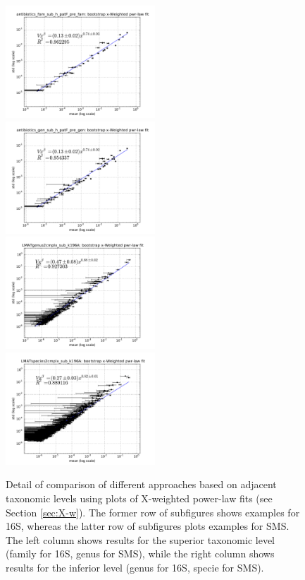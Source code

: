\begin{figure} 
  \includegraphics[width=0.5\textwidth]{results/taxalevel/xWb_fam_16S.pdf}
  \includegraphics[width=0.5\textwidth]{results/taxalevel/xWb_gen_16S.pdf}
  \includegraphics[width=0.5\textwidth]{results/taxalevel/xWb_gen_SMS.pdf}
  \includegraphics[width=0.5\textwidth]{results/taxalevel/xWb_spc_SMS.pdf}
\caption{Detail of comparison of different approaches based on adjacent taxonomic levels using plots of X-weighted power-law fits (see Section \ref{sec:X-w}). The former row of subfigures shows examples for 16S, whereas the latter row of subfigures plots examples for SMS. The left column shows results for the superior taxonomic level (family for 16S, genus for SMS), while the right column shows results for the inferior level (genus for 16S, specie for SMS).}
\label{fig:taxlev2}
\end{figure}



